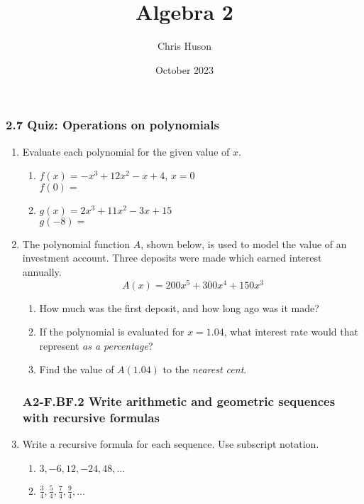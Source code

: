 \documentclass[12pt, twoside]{article}
\title{Algebra 2}
\author{Chris Huson}
\date{October 2023}
\begin{document}
\subsubsection*{2.7 Quiz: Operations on polynomials}
\begin{enumerate}
    \item Evaluate each polynomial for the given value of $x$.
    \begin{multicols}{2}
        \begin{enumerate}[itemsep=1cm]
            \item $f(x)=-x^3+12x^2-x+4$, $x=0$ \\[0.25cm] 
            $f(0) = $ \vspace{2cm}
            \item $g(x)=2x^3+11x^2-3x+15$ \\[0.25cm] 
            $g(-8) = $ \vspace{2cm}
        \end{enumerate}
        \end{multicols}
    
    \item The polynomial function $A$, shown below, is used to model the value of an investment account. Three deposits were made which earned interest annually.  $$A(x)=200x^5+300x^4+150x^3$$ 
    \begin{enumerate}[itemsep=1cm]
        \item How much was the first deposit, and how long ago was it made? \vspace{1cm}
        \item If the polynomial is evaluated for $x = 1.04$, what interest rate would that represent \emph{as a percentage}?
        \item Find the value of $A(1.04)$ to the \emph{nearest cent}. \vspace{2cm}
    \end{enumerate}

\subsubsection*{A2-F.BF.2 Write arithmetic and geometric sequences with recursive formulas}
\item Write a recursive formula for each sequence. Use subscript notation.
    \begin{multicols}{2}
    \begin{enumerate}
        \item $3, -6, 12, -24, 48, \dots$
        \item $\displaystyle \frac{3}{4}, \frac{5}{4}, \frac{7}{4}, \frac{9}{4},  \dots$ 
    \end{enumerate}
    \end{multicols}


\end{enumerate}
\end{document}
